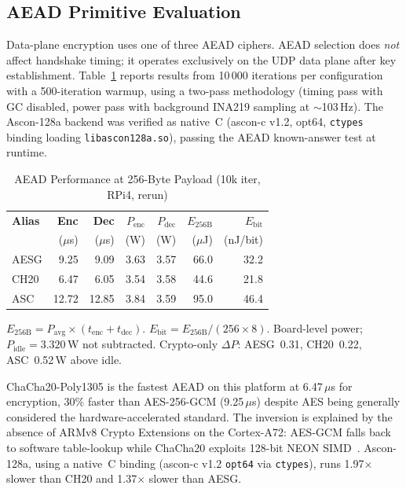 \subsection{AEAD Primitive Evaluation}
\label{sec:aead}

Data-plane encryption uses one of three AEAD ciphers.  AEAD selection
does \emph{not} affect handshake timing; it operates exclusively on the
UDP data plane after key establishment.  Table~\ref{tab:aead} reports
results from 10\,000 iterations per configuration with a 500-iteration
warmup, using a two-pass methodology (timing pass with GC disabled,
power pass with background INA219 sampling at $\sim$103\,Hz).
The Ascon-128a backend was verified as native~C (ascon-c v1.2, opt64,
\texttt{ctypes} binding loading \texttt{libascon128a.so}), passing the
AEAD known-answer test at runtime.

\begin{table}[t]
\centering
\caption{AEAD Performance at 256-Byte Payload (10k iter, RPi4, rerun)}
\label{tab:aead}
\footnotesize
\begin{tabular}{@{}lrrrrrr@{}}
\toprule
\textbf{Alias} &
  \textbf{Enc} & \textbf{Dec} &
  \textbf{$P_\text{enc}$} & \textbf{$P_\text{dec}$} &
  \textbf{$E_\text{256B}$} & \textbf{$E_\text{bit}$} \\
& ($\mu$s) & ($\mu$s) & (W) & (W) & ($\mu$J) & (nJ/bit) \\
\midrule
AESG & 9.25  & 9.09  & 3.63 & 3.57 & 66.0  & 32.2 \\
CH20 & 6.47  & 6.05  & 3.54 & 3.58 & 44.6  & 21.8 \\
ASC  & 12.72 & 12.85 & 3.84 & 3.59 & 95.0  & 46.4 \\
\bottomrule
\end{tabular}
\begin{tablenotes}
\footnotesize
\item $E_\text{256B} = P_\text{avg} \times (t_\text{enc} + t_\text{dec})$.
  $E_\text{bit} = E_\text{256B} / (256 \times 8)$.
  Board-level power; $P_\text{idle} = 3.320$\,W not subtracted.
  Crypto-only $\Delta P$: AESG~0.31, CH20~0.22, ASC~0.52\,W above idle.
\end{tablenotes}
\end{table}

ChaCha20-Poly1305 is the fastest AEAD on this platform at 6.47\,$\mu$s
for encryption, 30\% faster than AES-256-GCM (9.25\,$\mu$s) despite AES
being generally considered the hardware-accelerated standard.  The
inversion is explained by the absence of ARMv8 Crypto Extensions on the
Cortex-A72: AES-GCM falls back to software table-lookup while
ChaCha20 exploits 128-bit NEON SIMD~\cite{rfc8439}.  Ascon-128a, using
a native~C binding (ascon-c v1.2 \texttt{opt64} via \texttt{ctypes}),
runs 1.97$\times$ slower than CH20 and 1.37$\times$ slower than AESG.

